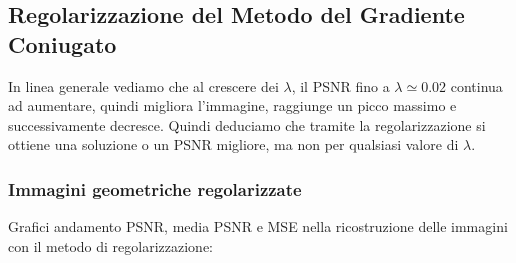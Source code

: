 {\color{ggreen}\subsection{Regolarizzazione del Metodo del Gradiente Coniugato }}
In linea generale vediamo che al crescere dei $\lambda$, il PSNR fino a $\lambda \simeq 0.02$ 
continua ad aumentare, 
quindi migliora l'immagine, raggiunge un picco massimo e successivamente decresce.
Quindi deduciamo che tramite la regolarizzazione si ottiene una soluzione o un PSNR migliore, ma non per 
qualsiasi valore di $\lambda$. 

{\color{ggreen}\subsubsection{Immagini geometriche regolarizzate}}
Grafici andamento PSNR, media PSNR e MSE nella ricostruzione delle immagini con il metodo di regolarizzazione:


